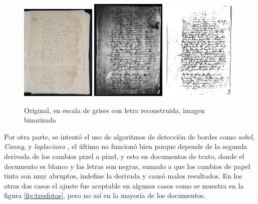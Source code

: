 \documentclass[11pt,a4paper]{article}
\begin{document}
\begin{figure}[h] \centering \begin{minipage}{1.0\textwidth} \includegraphics[width=0.32\textwidth]{original.jpg} \includegraphics[width=0.32\textwidth]{morph.jpg} \includegraphics[width=0.32\textwidth]{kraken.jpg} \caption{Original, en escala de grises con letra reconstruida, imagen binarizada} \label{fig:tresfotosmodelo} \end{minipage} \end{figure}

Por otra parte, se intentó el uso de algoritmos de detecci\'on de bordes como \textit{sobel}, \textit{Canny}, y \textit{laplaciano} , el \'ultimo no funcionó bien porque depende de la segunda derivada de los cambios pixel a pixel, y esto en documentos de texto, donde el documento es blanco y las letras son negras, sumado a que los cambios de papel tinta son muy abruptos, indefine la derivada y causó malos resultados. En los otros dos casos el ajuste fue aceptable en algunos casos como se muestra en la figura \ref{fig:tresfotos}, pero no así en la mayoría de los documentos.\\
\end{document}
